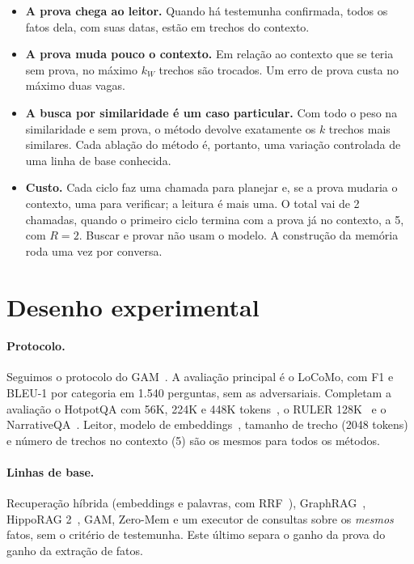 \documentclass[11pt]{article}
\begin{document}
\begin{itemize}[leftmargin=*,itemsep=3pt]
\item \textbf{A prova chega ao leitor.} Quando há testemunha confirmada,
  todos os fatos dela, com suas datas, estão em trechos do contexto.
\item \textbf{A prova muda pouco o contexto.} Em relação ao contexto que se
  teria sem prova, no máximo $k_W$ trechos são trocados. Um erro de prova
  custa no máximo duas vagas.
\item \textbf{A busca por similaridade é um caso particular.} Com todo o peso
  na similaridade e sem prova, o método devolve exatamente os $k$ trechos mais
  similares. Cada ablação do método é, portanto, uma variação controlada de
  uma linha de base conhecida.
\item \textbf{Custo.} Cada ciclo faz uma chamada para planejar e, se a prova
  mudaria o contexto, uma para verificar; a leitura é mais uma. O total vai de
  2 chamadas, quando o primeiro ciclo termina com a prova já no contexto, a 5,
  com $R=2$. Buscar e provar não usam o modelo. A construção da memória roda
  uma vez por conversa.
\end{itemize}

\section{Desenho experimental}

\paragraph{Protocolo.} Seguimos o protocolo do GAM~\citep{yan2025gam}. A
avaliação principal é o LoCoMo, com F1 e BLEU-1 por categoria em 1.540
perguntas, sem as adversariais. Completam a avaliação o HotpotQA com 56K,
224K e 448K tokens~\citep{yang2018hotpotqa}, o RULER
128K~\citep{hsieh2024ruler} e o NarrativeQA~\citep{kocisky2018narrativeqa}.
Leitor, modelo de embeddings~\citep{chen2024bgem3}, tamanho de trecho (2048
tokens) e número de trechos no contexto (5) são os mesmos para todos os
métodos.

\paragraph{Linhas de base.} Recuperação híbrida (embeddings e palavras, com
RRF~\citep{cormack2009rrf}), GraphRAG~\citep{edge2024graphrag}, HippoRAG
2~\citep{gutierrez2025hipporag2}, GAM, Zero-Mem e um executor de consultas
sobre os \emph{mesmos} fatos, sem o critério de testemunha. Este último separa
o ganho da prova do ganho da extração de fatos.
\end{document}
